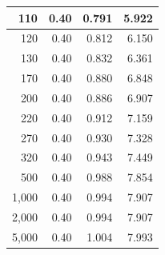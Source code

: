\documentclass[dvipdfmx,titlepage,a4j]{jsarticle}  %
\numberwithin{equation}{section}
\begin{document}
\begin{table}[H]
\begin{center}
\begin{tabular}{r|r|r|r}
      110                                      & 0.40                                            & 0.791                                     & 5.922                                  \\ \hline
      120                                      & 0.40                                            & 0.812                                     & 6.150                                  \\ \hline
      130                                      & 0.40                                            & 0.832                                     & 6.361                                  \\ \hline
      170                                      & 0.40                                            & 0.880                                     & 6.848                                  \\ \hline
      200                                      & 0.40                                            & 0.886                                     & 6.907                                  \\ \hline
      220                                      & 0.40                                            & 0.912                                     & 7.159                                  \\ \hline
      270                                      & 0.40                                            & 0.930                                     & 7.328                                  \\ \hline
      320                                      & 0.40                                            & 0.943                                     & 7.449                                  \\ \hline
      500                                      & 0.40                                            & 0.988                                     & 7.854                                  \\ \hline
      1,000                                    & 0.40                                            & 0.994                                     & 7.907                                  \\ \hline
      2,000                                    & 0.40                                            & 0.994                                     & 7.907                                  \\ \hline
      5,000                                    & 0.40                                            & 1.004                                     & 7.993                                  \\ \hline

\end{tabular}
\end{center}
\end{table}
\end{document}
